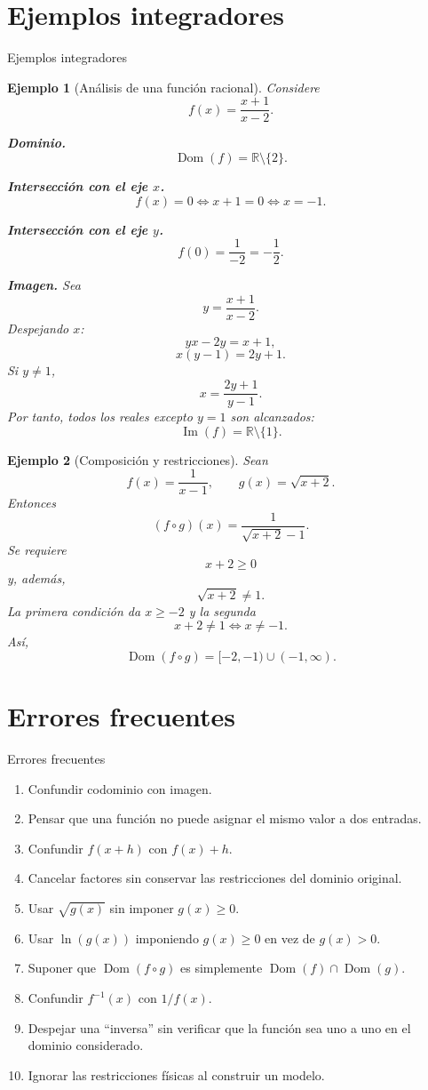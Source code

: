 \documentclass[aspectratio=169,10pt]{beamer}
\newtheorem{ejemplo}{Ejemplo}
\newcommand{\R}{\mathbb{R}}
\newcommand{\Dom}{\operatorname{Dom}}
\newcommand{\Ima}{\operatorname{Im}}
\begin{document}
\section*{Ejemplos integradores}
\begin{frame}{Ejemplos integradores}
\begin{ejemplo}[Análisis de una función racional]
Considere
\[
f(x)=\frac{x+1}{x-2}.
\]

\textbf{Dominio.}
\[
\Dom(f)=\R\setminus\{2\}.
\]

\textbf{Intersección con el eje $x$.}
\[
f(x)=0
\Longleftrightarrow x+1=0
\Longleftrightarrow x=-1.
\]

\textbf{Intersección con el eje $y$.}
\[
f(0)=\frac{1}{-2}=-\frac12.
\]

\textbf{Imagen.}
Sea
\[
y=\frac{x+1}{x-2}.
\]
Despejando $x$:
\[
yx-2y=x+1,
\]
\[
x(y-1)=2y+1.
\]
Si $y\neq1$,
\[
x=\frac{2y+1}{y-1}.
\]
Por tanto, todos los reales excepto $y=1$ son alcanzados:
\[
\Ima(f)=\R\setminus\{1\}.
\]
\end{ejemplo}

\begin{ejemplo}[Composición y restricciones]
Sean
\[
f(x)=\frac{1}{x-1},
\qquad
g(x)=\sqrt{x+2}.
\]
Entonces
\[
(f\circ g)(x)
=\frac{1}{\sqrt{x+2}-1}.
\]
Se requiere
\[
x+2\geq0
\]
y, además,
\[
\sqrt{x+2}\neq1.
\]
La primera condición da $x\geq-2$ y la segunda
\[
x+2\neq1\Longleftrightarrow x\neq-1.
\]
Así,
\[
\Dom(f\circ g)=[-2,-1)\cup(-1,\infty).
\]
\end{ejemplo}

\end{frame}
\section*{Errores frecuentes}
\begin{frame}{Errores frecuentes}
\begin{enumerate}
    \item Confundir codominio con imagen.
    \item Pensar que una función no puede asignar el mismo valor a dos entradas.
    \item Confundir $f(x+h)$ con $f(x)+h$.
    \item Cancelar factores sin conservar las restricciones del dominio original.
    \item Usar $\sqrt{g(x)}$ sin imponer $g(x)\geq0$.
    \item Usar $\ln(g(x))$ imponiendo $g(x)\geq0$ en vez de $g(x)>0$.
    \item Suponer que $\Dom(f\circ g)$ es simplemente
    $\Dom(f)\cap\Dom(g)$.
    \item Confundir $f^{-1}(x)$ con $1/f(x)$.
    \item Despejar una ``inversa'' sin verificar que la función sea uno a uno en
    el dominio considerado.
    \item Ignorar las restricciones físicas al construir un modelo.
\end{enumerate}

\end{frame}
\end{document}
